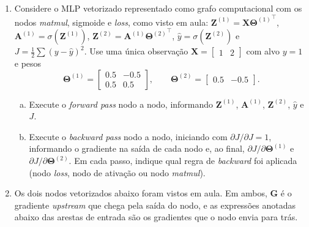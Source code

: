 \documentclass{dlproblemset}
\begin{document}
\begin{enumerate}[1)]
    \item Considere o MLP vetorizado representado como grafo computacional com os nodos \textit{matmul}, sigmoide e \textit{loss}, como visto em aula: $\mathbf{Z}^{(1)} = \mathbf{X}{\mathbf{\Theta}^{(1)}}^{\top}$, $\mathbf{A}^{(1)} = \sigma(\mathbf{Z}^{(1)})$, $\mathbf{Z}^{(2)} = \mathbf{A}^{(1)}{\mathbf{\Theta}^{(2)}}^{\top}$, $\hat{y} = \sigma(\mathbf{Z}^{(2)})$ e $J = \tfrac{1}{2}\sum\left(y - \hat{y}\right)^{2}$. Use uma única observação $\mathbf{X} = \begin{bmatrix} 1 & 2 \end{bmatrix}$ com alvo $y = 1$ e pesos
    $$\mathbf{\Theta}^{(1)} = \begin{bmatrix} 0.5 & -0.5 \\ 0.5 & 0.5 \end{bmatrix}, \qquad \mathbf{\Theta}^{(2)} = \begin{bmatrix} 0.5 & -0.5 \end{bmatrix}.$$
    \begin{enumerate}[a)]
        \item Execute o \textit{forward pass} nodo a nodo, informando $\mathbf{Z}^{(1)}$, $\mathbf{A}^{(1)}$, $\mathbf{Z}^{(2)}$, $\hat{y}$ e $J$.
        \item Execute o \textit{backward pass} nodo a nodo, iniciando com $\partial J/\partial J = 1$, informando o gradiente na saída de cada nodo e, ao final, $\partial J/\partial \mathbf{\Theta}^{(1)}$ e $\partial J/\partial \mathbf{\Theta}^{(2)}$. Em cada passo, indique qual regra de \textit{backward} foi aplicada (nodo \textit{loss}, nodo de ativação ou nodo \textit{matmul}).
    \end{enumerate}

    \item Os dois nodos vetorizados abaixo foram vistos em aula. Em ambos, $\mathbf{G}$ é o gradiente \textit{upstream} que chega pela saída do nodo, e as expressões anotadas abaixo das arestas de entrada são os gradientes que o nodo envia para trás.


\end{enumerate}
\end{document}
